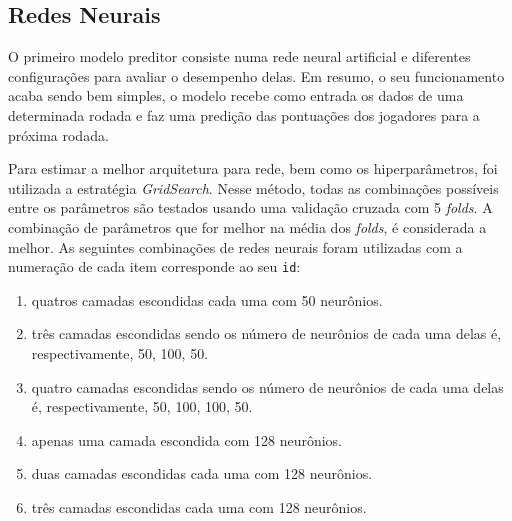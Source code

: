 \documentclass[conference]{IEEEtran}
\newcommand{\ttt}[1]{{\texttt{#1}}}
\newcommand{\tit}[1]{{\textit{#1}}}
\begin{document}
\subsection{Redes Neurais}

O  primeiro modelo  preditor consiste  numa rede  neural artificial  e
diferentes configurações para avaliar o desempenho delas. Em resumo,
o  seu funcionamento  acaba sendo  bem simples,  o modelo  recebe como
entrada os  dados de uma determinada  rodada e faz uma  predição das
pontuações dos jogadores para a próxima rodada.

Para   estimar  a   melhor  arquitetura   para  rede,   bem  como   os
hiperparâmetros,  foi  utilizada a  estratégia  \textit{GridSearch}.
Nesse método, todas as  combinações possíveis entre os parâmetros
são  testados usando  uma validação  cruzada com  5 \tit{folds}.  A
combinação de parâmetros que for  melhor na média dos \tit{folds},
é considerada a  melhor. As seguintes combinações  de redes neurais
foram utilizadas  com a  numeração de cada  item corresponde  ao seu
\ttt{id}:

\begin{enumerate}

\item quatros camadas escondidas cada uma com 50 neurônios.

\item três camadas escondidas sendo  os número de neurônios de cada
uma delas é, respectivamente, 50, 100, 50.

\item quatro camadas escondidas sendo os número de neurônios de cada
uma delas é, respectivamente, 50, 100, 100, 50.

\item apenas uma camada escondida com 128 neurônios.

\item duas camadas escondidas cada uma com 128 neurônios.

\item três camadas escondidas cada uma com 128 neurônios.

\end{enumerate}

\end{document}

